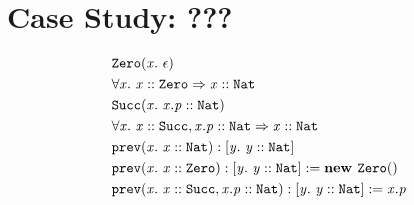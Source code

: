 \chapter{Case Study: ???}

\begin{align*}
&\constr{\texttt{Zero}}{x}{\epsilon}\\
&\progEnt{x}{\instOf{x}{\texttt{Zero}}}{\instOf{x}{\texttt{Nat}}}\\
&\constr{\texttt{Succ}}{x}{\instOf{x.p}{\texttt{Nat}}}\\
&\progEnt{x}{\instOf{x}{\texttt{Succ}}, \instOf{x.p}{\texttt{Nat}}}{\instOf{x}{\texttt{Nat}}}\\
&\mDecl{\texttt{prev}}{x}{\instOf{x}{\texttt{Nat}}}{\type{y}{\instOf{y}{\texttt{Nat}}}}\\
&\mImpl{\texttt{prev}}{x}{\instOf{x}{\texttt{Zero}}}{\type{y}{\instOf{y}{\texttt{Nat}}}}{\newInstNoArgs{\texttt{Zero}}}\\
&\mImpl{\texttt{prev}}{x}{\instOf{x}{\texttt{Succ}}, \instOf{x.p}{\texttt{Nat}}}{\type{y}{\instOf{y}{\texttt{Nat}}}}{x.p}
\end{align*}

